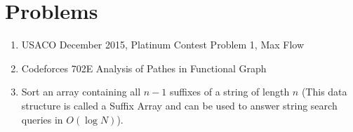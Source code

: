 \documentclass{article}
\begin{document}
\section {Problems}

\begin{enumerate}
    \item USACO December 2015, Platinum Contest Problem 1, Max Flow
    \item Codeforces 702E Analysis of Pathes in Functional Graph
    \item Sort an array containing all $n-1$ suffixes of a string of length $n$ (This data structure is called a Suffix Array and can be used to answer string search queries in $O(\log N)$). 
\end{enumerate}
\end{document}
